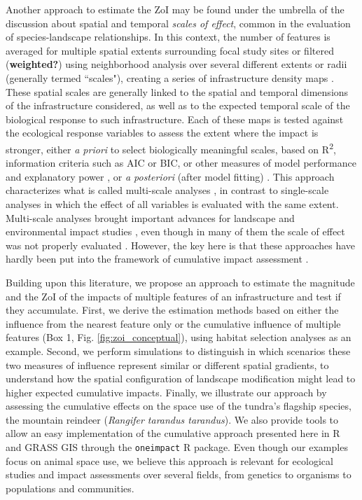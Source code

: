 \documentclass[titlepage]{article}
\begin{document}
Another approach to estimate the ZoI may be found under the umbrella of the discussion about spatial and temporal \textit{scales of effect}, common in the evaluation of species-landscape relationships. In this context, the number of features is averaged for multiple spatial extents surrounding focal study sites \citep{jackson_are_2015} or filtered (\textbf{weighted?}) using neighborhood analysis over several different extents or radii (generally termed ``scales"), creating a series of infrastructure density maps \citep{mcgarigal_multi-scale_2016}. These spatial scales are generally linked to the spatial and temporal dimensions of the infrastructure considered, as well as to the expected temporal scale of the biological response to such infrastructure. Each of these maps is tested against the ecological response variables to assess the extent where the impact is stronger, either \textit{a priori} to select biologically meaningful scales, based on R\textsuperscript{2}, information criteria such as AIC or BIC, or other measures of model performance and explanatory power \citep{jackson_are_2015, huais_multifit_2018}, or \textit{a posteriori} (after model fitting) \citep{thompson_influence_2002}. This approach characterizes what is called multi-scale analyses \citep[e.g.][]{zeller_multi-level_2017}, in contrast to single-scale analyses in which the effect of all variables is evaluated with the same extent. Multi-scale analyses brought important advances for landscape and environmental impact studies \citep[e.g.][]{mcgarigal_multi-scale_2016}, even though in many of them the scale of effect was not properly evaluated \citep{jackson_are_2015}. However, the key here is that these approaches have hardly been put into the framework of cumulative impact assessment \citep[but see, for instance,][]{polfus_identifying_2011}. 

Building upon this literature, we propose an approach to estimate the magnitude and the ZoI of the impacts of multiple features of an infrastructure and test if they accumulate. First, we derive the estimation methods based on either the influence from the nearest feature only or the cumulative influence of multiple features (Box 1, Fig. \ref{fig:zoi_conceptual}), using habitat selection analyses as an example. Second, we perform simulations to distinguish in which scenarios these two measures of influence represent similar or different spatial gradients, to understand how the spatial configuration of landscape modification might lead to higher expected cumulative impacts. 
Finally, we illustrate our approach by assessing the cumulative effects on the space use of the tundra's flagship species, the mountain reindeer (\textit{Rangifer tarandus tarandus}). We also provide tools to allow an easy implementation of the cumulative approach presented here in R \citep{r_core_team_r_2020} and GRASS GIS \citep{grass_development_team_geographic_2017} through the \verb|oneimpact| R package. Even though our examples focus on animal space use, we believe this approach is relevant for ecological studies and impact assessments over several fields, from genetics to organisms to populations and communities.
\end{document}

